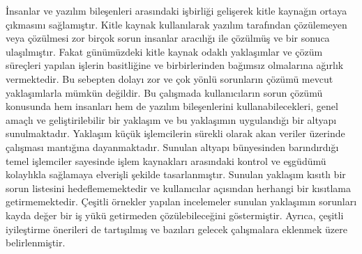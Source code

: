 \begin{ozet}
\.{I}nsanlar ve yaz{\i}l{\i}m bile\c{s}enleri aras{\i}ndaki i\c{s}birli\u{g}i geli\c{s}erek 
kitle kayna\u{g}{\i}n ortaya \c{c}{\i}kmas{\i}n{\i} sa\u{g}lam{\i}\c{s}t{\i}r. 
Kitle kaynak kullan{\i}larak yaz{\i}l{\i}m taraf{\i}ndan \c{c}\"{o}z\"{u}lemeyen veya \c{c}\"{o}z\"{u}lmesi zor bir\c{c}ok sorun insanlar arac{\i}l{\i}\u{g}{\i} 
ile \c{c}\"{o}z\"{u}lm\"{u}\c{s} ve bir sonuca ula\c{s}{\i}lm{\i}\c{s}t{\i}r. Fakat g\"{u}n\"{u}m\"{u}zdeki kitle kaynak odakl{\i} yakla\c{s}{\i}mlar ve \c{c}\"{o}z\"{u}m s\"{u}re\c{c}leri 
yap{\i}lan i\c{s}lerin basitli\u{g}ine ve birbirlerinden ba\u{g}{\i}ms{\i}z olmalar{\i}na a\u{g}{\i}rl{\i}k vermektedir. Bu sebepten dolay{\i} zor 
ve \c{c}ok y\"{o}nl\"{u} sorunlar{\i}n \c{c}\"{o}z\"{u}m\"{u} mevcut yakla\c{s}{\i}mlarla m\"{u}mk\"{u}n de\u{g}ildir. Bu \c{c}al{\i}\c{s}mada kullan{\i}c{\i}lar{\i}n sorun \c{c}\"{o}z\"{u}m\"{u} 
konusunda hem insanlar{\i} hem de yaz{\i}l{\i}m bile\c{s}enlerini kullanabilecekleri, genel ama\c{c}l{\i} ve geli\c{s}tirilebilir 
bir yakla\c{s}{\i}m ve bu yakla\c{s}{\i}m{\i}n uyguland{\i}\u{g}{\i} bir altyap{\i} sunulmaktad{\i}r. Yakla\c{s}{\i}m k\"{u}\c{c}\"{u}k i\c{s}lemcilerin s\"{u}rekli olarak 
akan veriler \"{u}zerinde \c{c}al{\i}\c{s}mas{\i} mant{\i}\u{g}{\i}na dayanmaktad{\i}r. Sunulan altyap{\i} b\"{u}nyesinden bar{\i}nd{\i}rd{\i}\u{g}{\i} temel i\c{s}lemciler 
sayesinde i\c{s}lem kaynaklar{\i} aras{\i}ndaki kontrol ve e\c{s}g\"{u}d\"{u}m\"{u} kolayl{\i}kla sa\u{g}lamaya elveri\c{s}li \c{s}ekilde tasarlanm{\i}\c{s}t{\i}r. 
Sunulan yakla\c{s}{\i}m k{\i}s{\i}tl{\i} bir sorun listesini hedeflememektedir ve kullan{\i}c{\i}lar a\c{c}{\i}s{\i}ndan herhangi bir k{\i}s{\i}tlama 
getirmemektedir. \c{C}e\c{s}itli \"{o}rnekler yap{\i}lan incelemeler sunulan yakla\c{s}{\i}m{\i}n sorunlar{\i} kayda de\u{g}er bir i\c{s} y\"{u}k\"{u} 
getirmeden \c{c}\"{o}z\"{u}lebilece\u{g}ini g\"{o}stermi\c{s}tir. Ayr{\i}ca, \c{c}e\c{s}itli iyile\c{s}tirme \"{o}nerileri de tart{\i}\c{s}{\i}lm{\i}\c{s} ve baz{\i}lar{\i} 
gelecek \c{c}al{\i}\c{s}malara eklenmek \"{u}zere belirlenmi\c{s}tir.
\end{ozet}